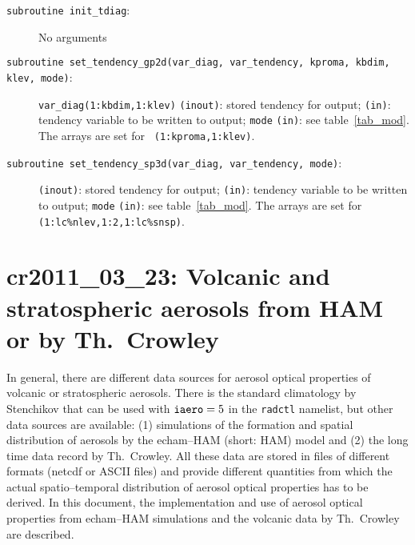 \begin{appendix}
\begin{description}
\item[{\tt subroutine init\_tdiag}:] No arguments
\item[{\tt subroutine set\_tendency\_gp2d(var\_diag, var\_tendency,
    kproma, kbdim, klev, mode)}:] {\tt var\_diag(1:kbdim,1:klev)} {\tt (inout)}: stored tendency
  for output;  {\tt (in)}:
  tendency variable to be written to output; \newline
  {\tt mode} 
    {\tt (in)}: see table~\ref{tab_mod}. \newline The arrays are set for {\tt
    (1:kproma,1:klev)}.
\item[{\tt subroutine set\_tendency\_sp3d(var\_diag, var\_tendency,
    mode)}:]\rule{0cm}{0.1cm} {\tt (inout)}: stored tendency 
  for output;  {\tt (in)}:
  tendency variable to be written to output; \newline
  {\tt mode} 
    {\tt (in)}: see table~\ref{tab_mod}. \newline The arrays are set for {\tt
    (1:lc\%nlev,1:2,1:lc\%snsp)}.
\end{description}

\clearpage\newpage
\section[cr2011\_03\_23: Stratospheric aerosols Th.~Crowley/HAM]{cr2011\_03\_23: Volcanic and stratospheric aerosols from HAM or by Th.~Crowley}\label{cr20110323}

In general, there are different data sources for 
aerosol optical properties of volcanic or stratospheric
aerosols. There is the standard climatology by Stenchikov that can be
used with ${\tt iaero}=5$ in the {\tt radctl} namelist, 
but other data sources are available: (1) simulations of the formation 
and spatial distribution of
aerosols by the echam--HAM (short: HAM) model and (2) the long time data
record by Th.~Crowley\cite{cro082}. All
these data are stored in files of different formats (netcdf or
ASCII files) and provide different quantities from which the actual
spatio--temporal distribution of aerosol
optical properties has to be derived. In this document, the
implementation and use of aerosol optical properties from echam--HAM
simulations and the volcanic data by Th.~Crowley are described.


\end{appendix}
